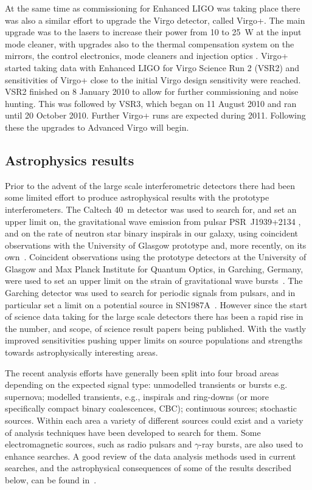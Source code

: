 \documentclass{article}
\begin{document}
At the same time as commissioning for Enhanced LIGO was taking place there was
also a similar effort to upgrade the Virgo detector, called Virgo+. The main
upgrade was to the lasers to increase their power from 10 to 25~W at the input
mode cleaner, with upgrades also to the thermal compensation system on the
mirrors, the control electronics, mode cleaners and injection optics
\cite{Acernese:2008b, AdVwhitepaper}. Virgo+ started taking data with Enhanced
LIGO for Virgo Science Run 2 (VSR2) and sensitivities of Virgo+ close to the
initial Virgo design sensitivity were reached. VSR2 finished on 8 January 2010
to allow for further commissioning and noise hunting. This was followed by VSR3,
which began on 11 August 2010 and ran until 20 October 2010. Further Virgo+
runs are expected during 2011. Following these the upgrades to Advanced
Virgo will begin.

\subsection{Astrophysics results}
\label{subsection:results}

Prior to the advent of the large scale interferometric detectors there had been
some limited effort to produce astrophysical results with the prototype
interferometers. The Caltech 40~m detector was used to search for, and set an
upper limit on, the gravitational wave emission from pulsar PSR~J1939+2134
\cite{Hereld:1984}, and on the rate of neutron star binary inspirals in our
galaxy, using coincident observations with the University of Glasgow prototype
\cite{Smith:1988} and, more recently, on its own~\cite{Allen:1999}. Coincident
observations using the prototype detectors at the University of Glasgow and Max
Planck Institute for Quantum Optics, in Garching, Germany, were used to set an
upper limit on the strain of gravitational wave bursts~\cite{Nicholson:1996}.
The Garching detector was used to search for periodic signals from pulsars, and
in particular set a limit on a potential source in SN1987A~\cite{Niebauer:1993}.
However since the start of science data taking for the large scale detectors
there has been a rapid rise in the number, and scope, of science result papers
being published. With the vastly improved sensitivities pushing upper limits on
source populations and strengths towards astrophysically interesting areas.

The recent analysis efforts have generally been split into four broad areas
depending on the expected signal type: unmodelled transients or bursts e.g.
supernova; modelled transients, e.g., inspirals and ring-downs (or more
specifically compact binary coalescences, CBC); continuous sources; stochastic
sources. Within each area a variety of different sources could exist and a
variety of analysis techniques have been developed to search for them. Some
electromagnetic sources, such as radio pulsars and $\gamma$-ray bursts, are also
used to enhance searches. A good review of the data analysis methods used in
current searches, and the astrophysical consequences of some of the results
described below, can be found in~\cite{Sathyaprakash:2009}.
\end{document}
